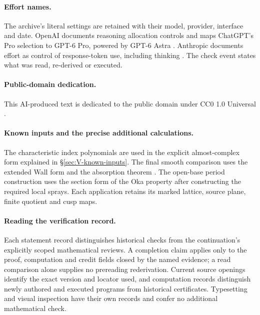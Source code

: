 \paragraph{Effort names.}
The archive's literal settings are retained with their model, provider,
interface and date. OpenAI documents reasoning allocation controls
\cite[sections ``Reasoning effort'' and ``Reasoning mode'']{OpenAIReasoning2026}
and maps ChatGPT's Pro selection to GPT-6 Pro, powered by GPT-6 Astra
\cite[section ``Choose a thinking level'']{OpenAIChatGPTPro2026}.
Anthropic documents effort as control of response-token use, including
thinking \cite[sections ``How effort works'' and ``Effort levels'']{AnthropicEffort2026}.
The check event states what was read, re-derived or executed.

\paragraph{Public-domain dedication.}
This AI-produced text is dedicated to the public domain under
CC0 1.0 Universal \cite{CC01Universal}.



\paragraph{Known inputs and the precise additional calculations.}
The characteristic index polynomials are used in the explicit
almost-complex form explained in \S\ref{sec:V-known-inputs}.
The final smooth comparison uses the extended Wall form
\cite[Definition 3.6 and Theorem 3.7(1), pp.~12--14]{IVVWallForm}
and the absorption theorem
\cite[Theorem A, p.~178]{IVVKramerStolz}.
The open-base period construction uses the section form of the Oka
property \cite[Definition 7.7, p.~22; Proposition 7.13(d), p.~24]{IVVOkaOneV5}
after constructing the required local sprays. Each application retains
its marked lattice, source plane, finite quotient and cusp maps.

\paragraph{Reading the verification record.}
Each statement record distinguishes historical checks from the
continuation's explicitly scoped mathematical reviews. A completion
claim applies only to the proof, computation and credit fields closed
by the named evidence; a read comparison alone supplies no prereading
rederivation. Current source openings identify the exact version and
locator used, and computation records distinguish newly authored and
executed programs from historical certificates. Typesetting and visual inspection have their
own records and confer no additional mathematical check.

